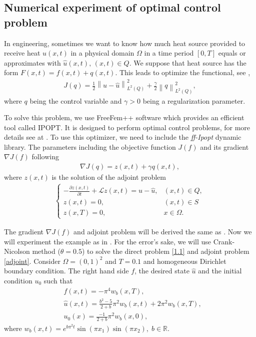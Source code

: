 
\subsection{Numerical experiment of optimal control problem}
\quad In engineering, sometimes we want to know how much heat source provided to receive heat $u(x, t)$ in a physical domain $\Omega$ in a time period $[0, T]$ equals or approximates with $\hat{u}(x, t),\, (x, t)\in Q.$ We suppose that heat source has the form $F(x, t)=f(x, t)+q(x, t)$. This leads to optimize the functional, see \cite{H92-2, H92-3},
\begin{align}\label{J}
	J(q)=\frac{1}{2}\left\|u-\hat{u}\right\|_{L^2(Q)}^2+\frac{\gamma}{2}\left\|q\right\|_{L^2(Q)}^2,
\end{align}
where $q$ being the control variable and $\gamma>0$ being a regularization parameter.

To solve this problem, we use FreeFem++ software which provides an efficient tool called IPOPT. It is designed to perform optimal control problems, for more details see at \cite{}. To use this optimizer, we need to include the \textit{ff-Ipopt} dynamic library. The parameters including the objective function $J(f)$ and its gradient $\nabla J(f)$ following
\begin{align}\label{gradJ}
	\nabla J(q)=z(x, t)+\gamma q(x, t),
	\end{align}
	where $z(x, t)$ is the solution of the adjoint problem
	\begin{align}\label{adjoint} 
	\begin{cases}
		-\frac{\partial z(x, t)}{\partial t}+\mathcal{L}z(x, t)=u-\hat{u}, & (x, t)\in Q,\\
		z(x, t)=0, & (x, t)\in S\\
		z(x, T)=0, & x\in \Omega.
	\end{cases}
\end{align}

The gradient $\nabla J(f)$ and adjoint problem will be derived the same as \cite{HTLI14}. Now we will experiment the example as in \cite{DB08}. For the error's sake, we will use Crank-Nicolson method ($\theta=0.5$) to solve the direct problem \eqref{1.1} and adjoint problem \eqref{adjoint}. Consider $\Omega=(0, 1)^2$ and $T=0.1$ and homogeneous Dirichlet boundary condition. The right hand side $f$, the desired state $\hat{u}$ and the initial condition $u_0$ such that
\begin{align*}
	&f(x, t)=-\pi^4w_b(x, T),\\
	&\hat{u}(x, t)=\frac{b^2-5}{2+b}\pi^2 w_b(x, t)+2\pi^2w_b(x, T),\\
	&u_0(x)=\frac{-1}{2+b}\pi^2w_b(x, 0),
\end{align*}
where $w_b(x, t)=e^{b\pi^2 t}\sin(\pi x_1)\sin(\pi x_2), \; b\in \mathbb{R}$.

